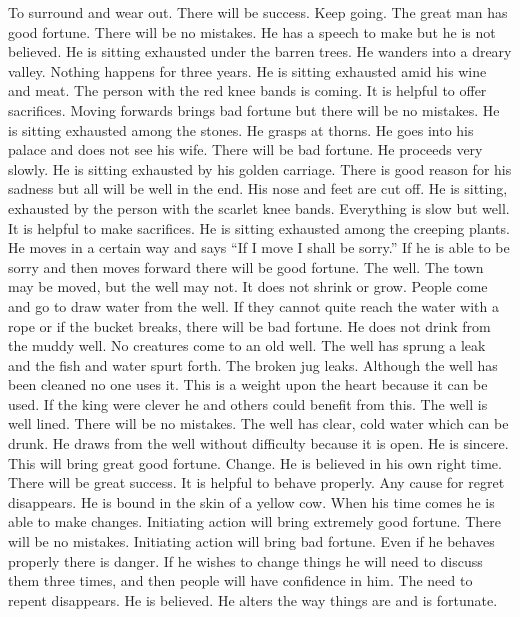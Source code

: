\or {}
	{To surround and wear out. There will be success. Keep going. The great man has good fortune. There
		will be no mistakes. He has a speech to make but he is not believed.}
	{He is sitting exhausted under the barren trees. He wanders into a dreary valley. Nothing happens
		for three years.}
	{He is sitting exhausted amid his wine and meat. The person with the red knee bands is coming. It is
		helpful to offer sacrifices. Moving forwards brings bad fortune but there will be no mistakes.}
	{He is sitting exhausted among the stones. He grasps at thorns. He goes into his palace and does not
		see his wife. There will be bad fortune.}
	{He proceeds very slowly. He is sitting exhausted by his golden carriage. There is good reason for his
		sadness but all will be well in the end.}
	{His nose and feet are cut off. He is sitting, exhausted by the person with the scarlet knee bands.
		Everything is slow but well. It is helpful to make sacrifices.}
	{He is sitting exhausted among the creeping plants. He moves in a certain way and says ``If I move I
		shall be sorry.'' If he is able to be sorry and then moves forward there will be good fortune.}
\or {}
	{The well. The town may be moved, but the well may not. It does not shrink or grow. People come and go
		to draw water from the well. If they cannot quite reach the water with a rope or if the
		bucket breaks, there will be bad fortune.}
	{He does not drink from the muddy well. No creatures come to an old well.}
	{The well has sprung a leak and the fish and water spurt forth. The broken jug leaks.}
	{Although the well has been cleaned no one uses it. This is a weight upon the heart because it can
		be used. If the king were clever he and others could benefit from this.}
	{The well is well lined. There will be no mistakes.}
	{The well has clear, cold water which can be drunk.}
	{He draws from the well without difficulty because it is open. He is sincere. This will bring great good
		fortune.}
\or {}
	{Change. He is believed in his own right time. There will be great success. It is helpful to behave
		properly. Any cause for regret disappears.}
	{He is bound in the skin of a yellow cow.}
	{When his time comes he is able to make changes. Initiating action will bring extremely good fortune.
		There will be no mistakes.}
	{Initiating action will bring bad fortune. Even if he behaves properly there is danger. If he wishes to
		change things he will need to discuss them three times, and then people will have confidence
		in him.}
	{The need to repent disappears. He is believed. He alters the way things are and is fortunate.}
